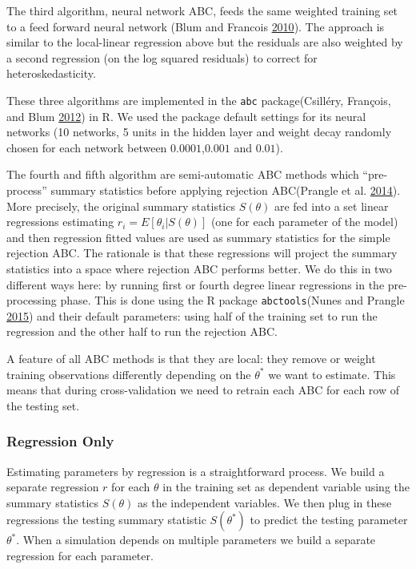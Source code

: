 \documentclass[]{article}
\begin{document}
The third algorithm, neural network ABC, feeds the same weighted training set to a feed forward neural network (Blum and Francois \protect\hyperlink{ref-Blum2010}{2010}).
The approach is similar to the local-linear regression above but the residuals are also weighted by a second regression (on the log squared residuals) to correct for heteroskedasticity.

These three algorithms are implemented in the \texttt{abc} package(Csilléry, François, and Blum \protect\hyperlink{ref-Csillery2012}{2012}) in R. We used the package default settings for its neural networks (10 networks, 5 units in the hidden layer and weight decay randomly chosen for each network between \(0.0001\),\(0.001\) and \(0.01\)).

The fourth and fifth algorithm are semi-automatic ABC methods which ``pre-process'' summary statistics before applying rejection ABC(Prangle et al. \protect\hyperlink{ref-Prangle2014}{2014}).
More precisely, the original summary statistics \(S(\theta)\) are fed into a set linear regressions estimating \(r_i=E[\theta_i|S(\theta)]\) (one for each parameter of the model) and then regression fitted values are used as summary statistics for the simple rejection ABC.
The rationale is that these regressions will project the summary statistics into a space where rejection ABC performs better.
We do this in two different ways here: by running first or fourth degree linear regressions in the pre-processing phase.
This is done using the R package \texttt{abctools}(Nunes and Prangle \protect\hyperlink{ref-Nunes2015}{2015}) and their default parameters: using half of the training set to run the regression and the other half to run the rejection ABC.

A feature of all ABC methods is that they are local: they remove or weight training observations differently depending on the \(\theta^*\) we want to estimate.
This means that during cross-validation we need to retrain each ABC for each row of the testing set.

\hypertarget{regression-only}{%
\subsubsection{Regression Only}\label{regression-only}}

Estimating parameters by regression is a straightforward process.
We build a separate regression \(r\) for each \(\theta\) in the training set as dependent variable using the summary statistics \(S(\theta)\) as the independent variables.
We then plug in these regressions the testing summary statistic \(S(\theta^*)\) to predict the testing parameter \(\theta^*\).
When a simulation depends on multiple parameters we build a separate regression for each parameter.
\end{document}
